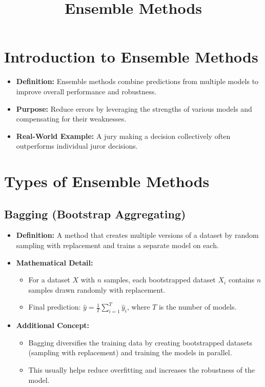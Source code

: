 \documentclass[10pt]{article}
\title{Ensemble Methods}
\author{}
\date{}
\begin{document}
\maketitle

\section{Introduction to Ensemble Methods}

\begin{itemize}
    \item \textbf{Definition:} Ensemble methods combine predictions from multiple models to improve overall performance and robustness.
    \item \textbf{Purpose:} Reduce errors by leveraging the strengths of various models and compensating for their weaknesses.
    \item \textbf{Real-World Example:} A jury making a decision collectively often outperforms individual juror decisions.
\end{itemize}

\section{Types of Ensemble Methods}

\subsection{Bagging (Bootstrap Aggregating)}

\begin{itemize}
    \item \textbf{Definition:} A method that creates multiple versions of a dataset by random sampling with replacement and trains a separate model on each.
    \item \textbf{Mathematical Detail:}
    \begin{itemize}
        \item For a dataset \(X\) with \(n\) samples, each bootstrapped dataset \(X_i\) contains \(n\) samples drawn randomly with replacement.
        \item Final prediction: \(\hat{y} = \frac{1}{T} \sum_{i=1}^{T} \hat{y}_i\), where \(T\) is the number of models.
    \end{itemize}
    \item \textbf{Additional Concept:} 
    \begin{itemize}
        \item Bagging diversifies the training data by creating bootstrapped datasets (sampling with replacement) and training the models in parallel.
        \item This usually helps reduce overfitting and increases the robustness of the model.
    \end{itemize}
\end{itemize}
\end{document}
